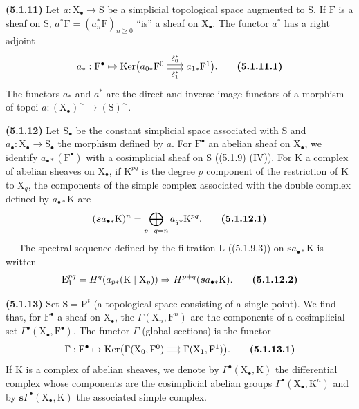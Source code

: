 \documentclass[11pt,leqno]{article}
\newcommand{\Page}[1]{\ifvmode\noindent\else\unskip\ \fi{\footnotesize\textcolor{gray}{[p.\,#1]}}\ \ignorespaces}
\begin{document}
\textbf{(5.1.11)} Let \(a:\mathrm{X}_{\bullet}\to\mathrm{S}\) be a simplicial topological space augmented to \(\mathrm{S}\). If \(\mathrm{F}\) is a sheaf on \(\mathrm{S}\), \(a^*\mathrm{F}=(a_n^*\mathrm{F})_{n\geq0}\) “is” a sheaf on \(\mathrm{X}_{\bullet}\). The functor \(a^*\) has a right adjoint
\[
a_*:\mathrm{F}^{\bullet}\mapsto
\operatorname{Ker}\bigl(
\begin{tikzcd}[ampersand replacement=\&, cramped, column sep=1.7em, baseline=-0.5ex]
a_{0*}\mathrm{F}^0
  \arrow[r, shift left=0.5ex, "\delta_0^*"]
  \arrow[r, shift right=0.5ex, "\delta_1^*"']
\& a_{1*}\mathrm{F}^1
\end{tikzcd}
\bigr).
\tag*{\textbf{(5.1.11.1)}}
\]
The functors \(a_*\) and \(a^*\) are the direct and inverse image functors of a morphism of topoi \(a:(\mathrm{X}_{\bullet})^{\sim}\to(\mathrm{S})^{\sim}\).

\textbf{(5.1.12)} Let \(\mathrm{S}_{\bullet}\) be the constant simplicial space associated with \(\mathrm{S}\) and \(a_{\bullet}:\mathrm{X}_{\bullet}\to\mathrm{S}_{\bullet}\) the morphism defined by \(a\). For \(\mathrm{F}^{\bullet}\) an abelian sheaf on \(\mathrm{X}_{\bullet}\), we identify \(a_{\bullet *}(\mathrm{F}^{\bullet})\) with a cosimplicial sheaf on \(\mathrm{S}\) ((5.1.9) (IV)). For \(\mathrm{K}\) a complex of abelian sheaves on \(\mathrm{X}_{\bullet}\), if \(\mathrm{K}^{pq}\) is the degree \(p\) component of the restriction of \(\mathrm{K}\) to \(\mathrm{X}_q\), the components of the simple complex associated with the double complex defined by \(a_{\bullet *}\mathrm{K}\) are
\[
(\boldsymbol{s}a_{\bullet *}\mathrm{K})^n
=\bigoplus_{p+q=n}a_{q*}\mathrm{K}^{pq}.
\tag*{\textbf{(5.1.12.1)}}
\]
\Page{12}
The spectral sequence defined by the filtration \(\mathrm{L}\) ((5.1.9.3)) on \(\boldsymbol{s}a_{\bullet *}\mathrm{K}\) is written
\[
\mathrm{E}_1^{pq}
=H^q(a_{p*}(\mathrm{K}\mid\mathrm{X}_{p}))
\Rightarrow H^{p+q}(\boldsymbol{s}a_{\bullet *}\mathrm{K}).
\tag*{\textbf{(5.1.12.2)}}
\]

\textbf{(5.1.13)} Set \(\mathrm{S}=\mathrm{P}^{t}\) (a topological space consisting of a single point). We find that, for \(\mathrm{F}^{\bullet}\) a sheaf on \(\mathrm{X}_{\bullet}\), the \(\Gamma(\mathrm{X}_n,\mathrm{F}^n)\) are the components of a cosimplicial set \(\Gamma^{\bullet}(\mathrm{X}_{\bullet},\mathrm{F}^{\bullet})\). The functor \(\Gamma\) (global sections) is the functor
\[
\Gamma:\mathrm{F}^{\bullet}\mapsto
\operatorname{Ker}\bigl(
\begin{tikzcd}[ampersand replacement=\&, cramped, column sep=1.4em, baseline=-0.5ex]
\Gamma(\mathrm{X}_0,\mathrm{F}^0)
  \arrow[r, shift left=0.5ex]
  \arrow[r, shift right=0.5ex]
\& \Gamma(\mathrm{X}_1,\mathrm{F}^1)
\end{tikzcd}
\bigr).
\tag*{\textbf{(5.1.13.1)}}
\]
If \(\mathrm{K}\) is a complex of abelian sheaves, we denote by \(\Gamma^{\bullet}(\mathrm{X}_{\bullet},\mathrm{K})\) the differential complex whose components are the cosimplicial abelian groups \(\Gamma^{\bullet}(\mathrm{X}_{\bullet},\mathrm{K}^n)\) and by \(\boldsymbol{s}\Gamma^{\bullet}(\mathrm{X}_{\bullet},\mathrm{K})\) the associated simple complex.
\end{document}
